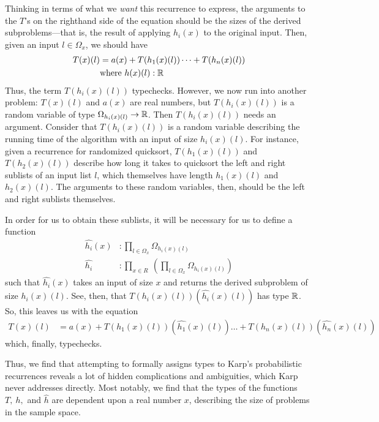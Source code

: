 Thinking in terms of what we \emph{want} this recurrence to express, the arguments to the $T$'s on the righthand side of
the equation should be the sizes of the derived subproblems---that is, the result of applying $h_i(x)$ to the original input.
Then, given an input $l \in \Omega_x$, we should have
\begin{align*}
T(x)(l) &= a(x) + T(h_1(x)(l)) \dots + T(h_n(x)(l)) \\
&\text{where } h(x)(l) : \mathbb{R} 
\end{align*}
 Thus, the term $T(h_i(x)(l))$ typechecks. However, we now run into another problem: $T(x)(l)$ and $a(x)$ are real numbers,
but $T(h_i(x)(l))$ is a random variable of type $\Omega_{h_i(x)(l)} \rightarrow \mathbb{R}$. Then $T(h_i(x)(l))$ needs an argument.
Consider that $T(h_i(x)(l))$ is a random variable describing the running time of the algorithm with an input of size 
$h_i(x)(l)$. For instance, given a recurrence for randomized quicksort, $T(h_1(x)(l))$ and $T(h_2(x)(l))$ describe how long it 
takes to quicksort the left and right sublists of an input list $l$, which themselves have length $h_1(x)(l)$ and
$h_2(x)(l)$. The arguments to these random variables, then, should be the left and right sublists themselves. 

 In order for us to obtain these sublists, it will be necessary for us to define a function 
 \begin{align*}
 \hat{h_i}(x) &: \prod_{l \in \Omega_x} \Omega_{h_i(x)(l)} \\
 \hat{h_i} &: \prod_{x \in R} \ ( \prod_{l \in \Omega_x} \Omega_{h_i(x)(l)})
 \end{align*}
 such that $\hat{h_i}(x)$ takes an input of size $x$ and returns the derived subproblem of size $h_i(x)(l)$. See, then, that
 $T(h_i(x)(l))(\hat{h_i}(x)(l))$ has type $\mathbb{R}$. So, this leaves us with the equation
 \begin{align*}
 T(x)(l) &= a(x) + T(h_1(x)(l))(\hat{h_1}(x)(l)) \dots + T(h_n(x)(l))(\hat{h_n}(x)(l))
 \end{align*}
 which, finally, typechecks.
 
 Thus, we find that attempting to formally assigns types to Karp's probabilistic recurrences reveals a lot of hidden 
 complications and ambiguities, which Karp never addresses directly. Most notably, we find that the types of the 
 functions $T, \ h,$ and $\hat{h}$ are dependent upon a real number $x$, describing the size of problems in the sample space.
 
